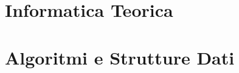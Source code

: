 \documentclass{book}
\begin{document}
  

  \tableofcontents
  \clearpage

  \part{Informatica Teorica}

  
  
  
  
  
  

  \part{Algoritmi e Strutture Dati}
  
  
  
  
\end{document}

